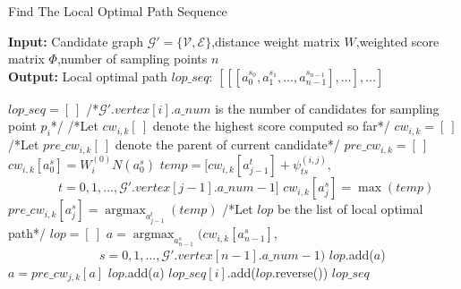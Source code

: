 \documentclass[a4paper,12pt]{article}
\begin{document}
 
\begin{CJK}{UTF8}{gbsn} 
\begin{algorithm} 
    \setcounter{algorithm}{0}
    \caption{Find The Local Optimal Path Sequence} 
    \hspace*{0.02in} {\bf Input:} Candidate graph $\mathcal{G}'=\{\mathcal{V},\mathcal{E}\}$,distance weight matrix $W$,weighted score matrix $\Phi$,number of sampling points $n$ \\ 
    \hspace*{0.02in} {\bf Output:} Local optimal path $lop\_seq$: $[[[a_0^{s_0},a_1^{s_1},\dots,a_{n-1}^{s_{n-1}}],\dots],\dots]$
    \begin{algorithmic}[1]
    \iffalse
    \fi
	\State $lop\_seq=[\ ]$
            \State /*$\mathcal{G}'.vertex[i].a\_num$ is the number of candidates for sampling point $p_i$*/
				\State /*Let $cw_{i,k}[\ ]$ denote the highest score computed so far*/ 
				\State $cw_{i,k} = [\ ]$ 
				\State /*Let $pre\_cw_{i,k}[\ ]$ denote the parent of current candidate*/ 
				\State $pre\_cw_{i,k} = [\ ]$ 
					\State $cw_{i,k}[a_0^s] = W_i^{(0)}N(a_0^s)$
				\EndFor
						\State $temp=[cw_{i,k}[a_{j-1}^t]+\psi_{ts}^{(i,j)},$
						\State $\qquad \quad \quad t=0,1,\dots,\mathcal{G}'.vertex[j-1].a\_num-1]$
						\State $cw_{i,k}[a_{j}^s] = \max{(temp)}$
						\State $pre\_cw_{i,k}[a_j^s] = \mathop{\mathrm{argmax}}_{a_{j-1}^t}{(temp)}
$
					\EndFor
				\EndFor
				\State /*Let $lop$ be the list of local optimal path*/
				\State $lop = [\ ]$
				\State $a = \mathop{\mathrm{argmax}}_{a_{n-1}^s}{(cw_{i,k}[a_{n-1}^s],}$
				\State $\qquad \qquad \qquad \quad \; s=0,1,\dots,\mathcal{G}'.vertex[n-1].a\_num-1)$
					\State $lop$.add($a$)
					\State $a = pre\_cw_{j,k}[a]$
				\EndFor
				\State $lop$.add($a$)
				\State $lop\_seq[i]$.add($lop$.reverse())
			\EndFor
        \EndFor
	\State \Return $lop\_seq$
    \end{algorithmic} 
\end{algorithm}
\end{CJK} 
\end{document}
